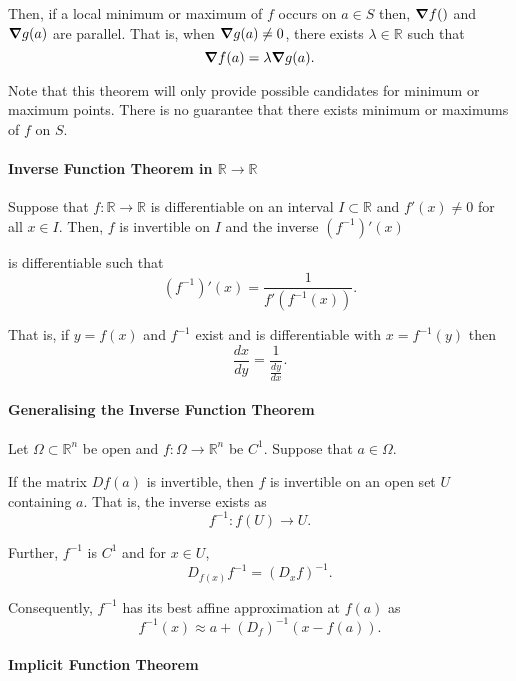 Then, if a local minimum or maximum of \(f\) occurs on \(a\in S\) then,
\(\grad f()\) and \(\grad g(a)\) are parallel.
That is, when \(\grad g(a) \neq 0\), there exists \(\lambda \in \mathbb{R}\)
such that
\[
    \grad f (a) = \lambda \grad g(a).
\]

Note that this theorem will only provide possible candidates for minimum or maximum
points. There is no guarantee that there exists minimum or maximums of \(f\) on \(S\).

\paragraph{Inverse Function Theorem in \(\mathbb{R}\to \mathbb{R}\)}
Suppose that \(f: \mathbb{R}\to \mathbb{R}\) is differentiable on an
interval \(I\subset \mathbb{R}\) and \(f'(x)\neq 0\) for all \(x\in I.\)
Then, \(f\) is invertible on \(I\) and the inverse \( (f^{-1})'(x) \)

is differentiable such that
\[
    (f^{-1})'(x) = \dfrac{1}{f'(f^{-1}(x))}.
\]

That is, if \(y = f(x)\) and \(f^{-1}\) exist and is differentiable with \(x = f^{-1}(y)\)
then
\[ \frac{dx}{dy} = \frac{1}{\frac{dy}{dx}}. \]

\paragraph{Generalising the Inverse Function Theorem}
Let \(\Omega\subset \mathbb{R}^n\) be open and \(f: \Omega\to \mathbb{R}^n\)
be \(C^1\). Suppose that \(a\in \Omega\).

If the matrix \(Df(a)\) is invertible, then \(f\) is invertible on an open
set \(U\) containing \(a\).
That is, the inverse exists as
\[f^{-1}: f(U)\to U.\]

Further, \(f^{-1}\) is \(C^1\) and for \(x\in U\),
\[
    D_{f(x)}f^{-1} = (D_xf)^{-1}.
\]

Consequently, \(f^{-1}\) has its best affine approximation at \(f(a)\)
as
\[
    f^{-1}(x) \approx a + (D_f)^{-1}(x - f(a)).
\]

\paragraph{Implicit Function Theorem}



